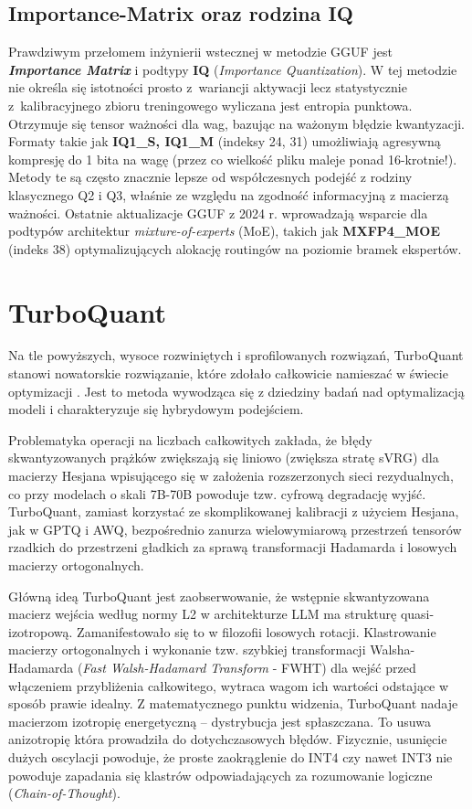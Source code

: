 \subsection{Importance-Matrix oraz rodzina IQ}
Prawdziwym przełomem inżynierii wstecznej w metodzie GGUF jest \textbf{\textit{Importance Matrix}} i podtypy \textbf{IQ} (\textit{Importance Quantization}). W tej metodzie nie określa się istotności prosto z~wariancji aktywacji lecz statystycznie z~kalibracyjnego zbioru treningowego wyliczana jest entropia punktowa. Otrzymuje się tensor ważności dla wag, bazując na ważonym błędzie kwantyzacji.
Formaty takie jak \textbf{IQ1\_S, IQ1\_M} (indeksy 24, 31) umożliwiają agresywną kompresję do 1 bita na wagę (przez co wielkość pliku maleje ponad 16-krotnie!). Metody te są często znacznie lepsze od współczesnych podejść z rodziny klasycznego Q2 i Q3, właśnie ze względu na zgodność informacyjną z macierzą ważności.
Ostatnie aktualizacje GGUF z 2024 r. wprowadzają wsparcie dla podtypów architektur \textit{mixture-of-experts} (MoE), takich jak \textbf{MXFP4\_MOE} (indeks 38) optymalizujących alokację routingów na poziomie bramek ekspertów.

\section{TurboQuant}

Na tle powyższych, wysoce rozwiniętych i sprofilowanych rozwiązań, TurboQuant stanowi nowatorskie rozwiązanie, które zdołało całkowicie namieszać w świecie optymizacji \cite{zandieh2025turboquant,ashkboos2024quarotoutlierfree4bitinference}. Jest to metoda wywodząca się z dziedziny badań nad optymalizacją modeli i charakteryzuje się hybrydowym podejściem.

Problematyka operacji na liczbach całkowitych zakłada, że błędy skwantyzowanych prążków zwiększają się liniowo (zwiększa stratę sVRG) dla macierzy Hesjana wpisującego się w założenia rozszerzonych sieci rezydualnych, co przy modelach o skali 7B-70B powoduje tzw. cyfrową degradację wyjść. TurboQuant, zamiast korzystać ze skomplikowanej kalibracji z użyciem Hesjana, jak w GPTQ i AWQ, bezpośrednio zanurza wielowymiarową przestrzeń tensorów rzadkich do przestrzeni gładkich za sprawą transformacji Hadamarda i losowych macierzy ortogonalnych.

Główną ideą TurboQuant jest zaobserwowanie, że wstępnie skwantyzowana macierz wejścia według normy L2 w architekturze LLM ma strukturę quasi-izotropową. Zamanifestowało się to w filozofii losowych rotacji. Klastrowanie macierzy ortogonalnych i wykonanie tzw. szybkiej transformacji Walsha-Hadamarda (\textit{Fast Walsh-Hadamard Transform} - FWHT) dla wejść przed włączeniem przybliżenia całkowitego, wytraca wagom ich wartości odstające w sposób prawie idealny. Z matematycznego punktu widzenia, TurboQuant nadaje macierzom izotropię energetyczną – dystrybucja jest spłaszczana. To usuwa anizotropię która prowadziła do dotychczasowych błędów. Fizycznie, usunięcie dużych oscylacji powoduje, że proste zaokrąglenie do INT4 czy nawet INT3 nie powoduje zapadania się klastrów odpowiadających za rozumowanie logiczne (\textit{Chain-of-Thought}).

